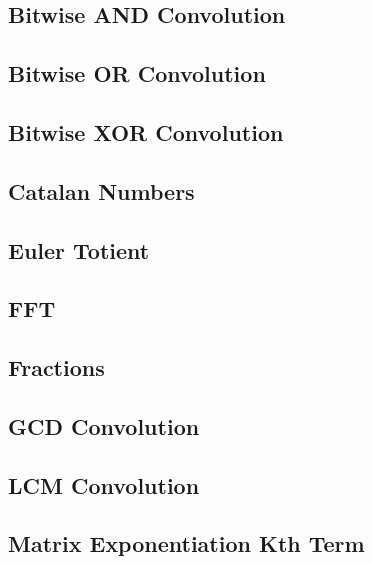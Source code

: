 \subsection{Bitwise AND Convolution}
\raggedbottom
\hrulefill
\subsection{Bitwise OR Convolution}
\raggedbottom
\hrulefill
\subsection{Bitwise XOR Convolution}
\raggedbottom
\hrulefill
\subsection{Catalan Numbers}
\raggedbottom
\hrulefill
\subsection{Euler Totient}
\raggedbottom
\hrulefill
\subsection{FFT}
\raggedbottom
\hrulefill
\subsection{Fractions}
\raggedbottom
\hrulefill
\subsection{GCD Convolution}
\raggedbottom
\hrulefill
\subsection{LCM Convolution}
\raggedbottom
\hrulefill
\subsection{Matrix Exponentiation Kth Term}
\raggedbottom
\hrulefill
